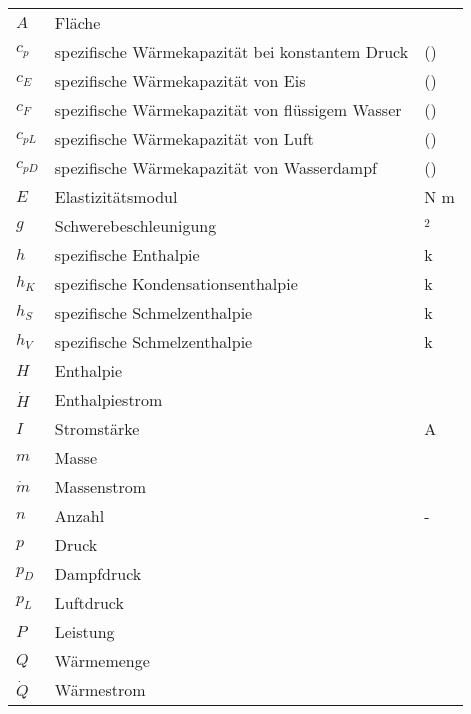\begin{onehalfspacing}
\begin{longtable}[h]{p{} p{} p{}}
		$A$ & Fläche & \squaremetre\\
		$c_{p}$&spezifische Wärmekapazität bei konstantem Druck&\joule\per(\kilogram\usk\kelvin)\\
		$c_{E}$&spezifische Wärmekapazität von Eis&\joule\per(\kilogram\usk\kelvin)\\		
		$c_{F}$&spezifische Wärmekapazität von flüssigem Wasser&\joule\per(\kilogram\usk\kelvin)\\
		$c_{pL}$&spezifische Wärmekapazität von Luft&\joule\per(\kilogram\usk\kelvin)\\	
		$c_{pD}$&spezifische Wärmekapazität von Wasserdampf &\joule\per(\kilogram\usk\kelvin)\\		
		$E$ & Elastizitätsmodul & N \per m\squaremetre \\
		$g$ & Schwerebeschleunigung & \meter \per \second$^2$\\
		$h $ & spezifische Enthalpie & k\joule \per \kilogram\\		
		$h_{K} $ & spezifische Kondensationsenthalpie & k\joule \per \kilogram\\	
		$h_{S} $ & spezifische Schmelzenthalpie & k\joule \per \kilogram\\	
		$h_{V} $ & spezifische Schmelzenthalpie & k\joule \per \kilogram\\
		$H $ & Enthalpie & \joule\\		
		$\dot{H}$ & Enthalpiestrom & \joule\per\second\\
		$I$ 	& Stromstärke & A \\
		$m$ & Masse & \kilogram \\
		$\dot{m}$ & Massenstrom & \kilogram\per\second\\
		$n$ & Anzahl & -\\
		$p$ & Druck & \pascal\\
		$p_{D}$ & Dampfdruck & \pascal\\
		$p_{L}$ & Luftdruck & \pascal\\		
		$P$ & Leistung & \watt \\
		$Q$		& Wärmemenge & \joule\\
		$\dot{Q}$ & Wärmestrom & \watt\\

\end{longtable}
\end{onehalfspacing}
